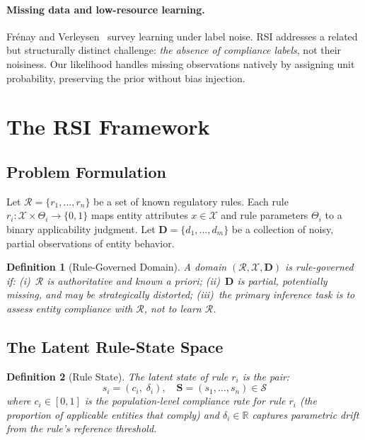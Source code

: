 \documentclass[letterpaper]{article}
\newtheorem{definition}{Definition}
\begin{document}
\paragraph{Missing data and low-resource learning.}
Fr\'enay and Verleysen~\citeyearpar{frenay2014classification} survey
learning under label noise. RSI addresses a related but structurally
distinct challenge: \emph{the absence of compliance labels}, not their
noisiness. Our likelihood handles missing observations natively by
assigning unit probability, preserving the prior without bias injection.

\section{The RSI Framework}
\label{sec:framework}

\subsection{Problem Formulation}

Let $\mathcal{R} = \{r_1, \ldots, r_n\}$ be a set of known regulatory
rules. Each rule $r_i : \mathcal{X} \times \Theta_i \to \{0,1\}$ maps
entity attributes $x \in \mathcal{X}$ and rule parameters $\Theta_i$
to a binary applicability judgment. Let
$\mathbf{D} = \{d_1, \ldots, d_m\}$ be a collection of noisy, partial
observations of entity behavior.

\begin{definition}[Rule-Governed Domain]
A domain $(\mathcal{R}, \mathcal{X}, \mathbf{D})$ is \emph{rule-governed}
if: (i)~$\mathcal{R}$ is authoritative and known a priori;
(ii)~$\mathbf{D}$ is partial, potentially missing, and may be
strategically distorted; (iii)~the primary inference task is to assess
entity compliance with $\mathcal{R}$, not to learn $\mathcal{R}$.
\end{definition}

\subsection{The Latent Rule-State Space}

\begin{definition}[Rule State]
The latent state of rule $r_i$ is the pair:
\[
  s_i = (c_i,\; \delta_i), \quad
  \mathbf{S} = (s_1, \ldots, s_n) \in \mathcal{S}
\]
where $c_i \in [0,1]$ is the \emph{population-level compliance rate}
for rule $r_i$ (the proportion of applicable entities that comply) and
$\delta_i \in \mathbb{R}$ captures \emph{parametric drift} from the
rule's reference threshold.
\end{definition}
\end{document}
